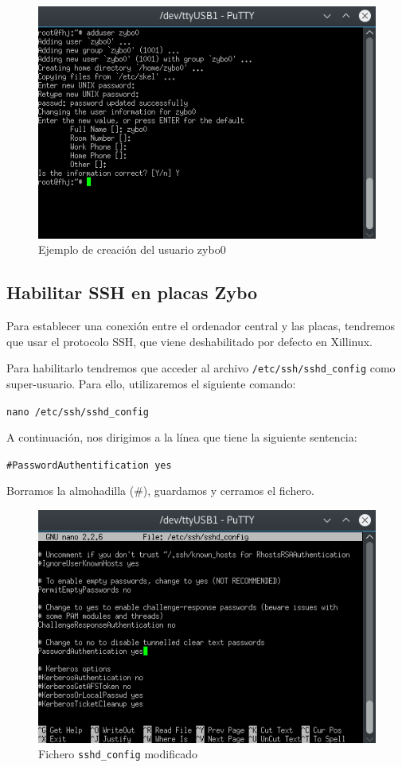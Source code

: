 \begin{figure}[h]
	\centering
	\includegraphics[scale=0.9]{Anexos/Anexo2/Linux/NuevoUsuario.png}
	\caption{Ejemplo de creación del usuario zybo0}
	\label{Ejemplo de creación del usuario zybo0}
\end{figure}


\subsection{Habilitar SSH en placas Zybo}
Para establecer una conexión entre el ordenador central y las placas, tendremos que usar el protocolo SSH, que viene deshabilitado por defecto en Xillinux.

Para habilitarlo tendremos que acceder al archivo \texttt{/etc/ssh/sshd\_config} como super-usuario. Para ello, utilizaremos el siguiente comando:
\begin{center}
	\texttt{nano /etc/ssh/sshd\_config}
\end{center}
A continuación, nos dirigimos a la línea que tiene la siguiente sentencia:
\begin{center}
	\texttt{\#PasswordAuthentification yes}
\end{center}
Borramos la almohadilla (\#), guardamos y cerramos el fichero.
\begin{figure}[h]
	\centering
	\includegraphics[scale=0.8]{Anexos/Anexo2/Linux/SSH.png}
	\caption{Fichero \texttt{sshd\_config} modificado}
	\label{Fichero ssh_d modificado}
\end{figure}

